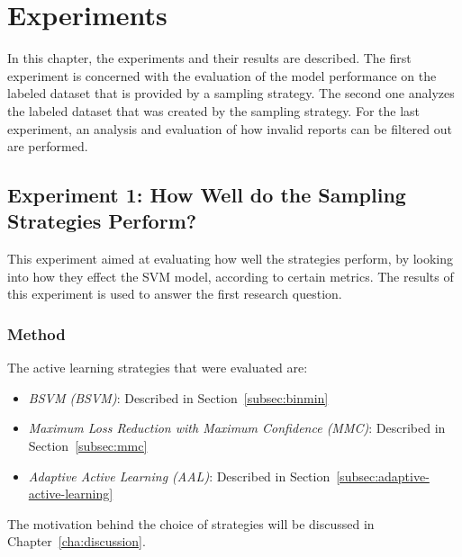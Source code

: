 \chapter{Experiments}
\label{cha:experiments}

In this chapter, the experiments and their results are described.
The first experiment is concerned with the evaluation of the model performance on the labeled dataset that is provided by a sampling strategy.
The second one analyzes the labeled dataset that was created by the sampling strategy.
For the last experiment, an analysis and evaluation of how invalid reports can be filtered out are performed.

\section{Experiment 1: How Well do the Sampling Strategies Perform?}

This experiment aimed at evaluating how well the strategies perform, by looking into how they effect the SVM model, according to certain metrics.
The results of this experiment is used to answer the first research question.

\subsection{Method}

The active learning strategies that were evaluated are:
\begin{itemize}
    \item \textit{BSVM (BSVM)}: Described in Section~\ref{subsec:binmin}
    \item \textit{Maximum Loss Reduction with Maximum Confidence (MMC)}: Described in Section~\ref{subsec:mmc}
    \item \textit{Adaptive Active Learning (AAL)}: Described in Section~\ref{subsec:adaptive-active-learning}
\end{itemize}
The motivation behind the choice of strategies will be discussed in Chapter~\ref{cha:discussion}.


